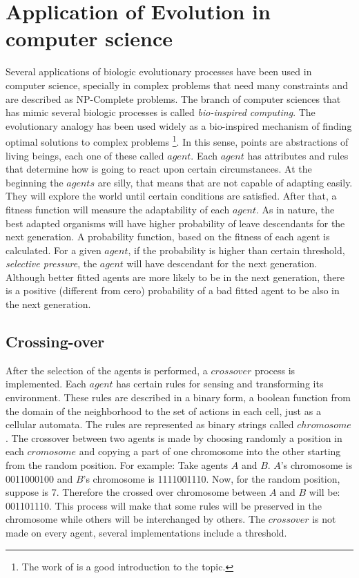 \documentclass{article}
\begin{document}
\section{Application of Evolution in computer science}

Several applications of biologic evolutionary processes have been used in computer science, specially in complex problems that need many constraints and are described as NP-Complete problems. The branch of computer sciences that has mimic several biologic processes is called {\em bio-inspired computing}. The evolutionary analogy has been used widely as a bio-inspired mechanism of finding optimal solutions to complex problems \footnote{The work of  \citet{mitchell_ga} is a good introduction to the topic.}. In this sense, points are abstractions of living beings, each one of these called $agent$. Each $agent$ has attributes and rules that determine how is going to react upon certain circumstances. At the beginning the $agents$ are silly, that means that are not capable of adapting easily. 
They will explore the world until certain conditions are satisfied. After that, a fitness function will measure the adaptability of each $agent$. As in nature, the best adapted organisms will have higher probability of leave descendants for the next generation. A probability function, based on the fitness of each agent is calculated. For a given $agent$, if the probability is higher than certain threshold, {\em selective pressure}, the $agent$ will have descendant for the next generation. Although better fitted agents are more likely to be in the next generation, there is a positive (different from cero) probability of a bad fitted agent to be also in the next generation.

\subsection{Crossing-over}
After the selection of the agents is performed, a $crossover$ process is implemented. Each $agent$ has certain rules for sensing and transforming its environment. These rules are described in a binary form, a boolean function from the domain of the neighborhood to the set of actions in each cell,  just as a cellular automata. The rules are represented as binary strings called $chromosome$. The crossover between two agents is made by choosing randomly a position in each $cromosome$ and copying a part of one chromosome into the other starting from the random position. For example: Take agents $A$ and $B$. $A$'s chromosome is 0011000100 and $B$'s chromosome is 1111001110. Now, for the random position, suppose is 7. Therefore the crossed over chromosome between $A$ and $B$ will be: 001101110. This process will make that some rules will be preserved in the chromosome while others will be interchanged by others. The $crossover$ is not made on every agent, several implementations include a threshold.
\end{document}

